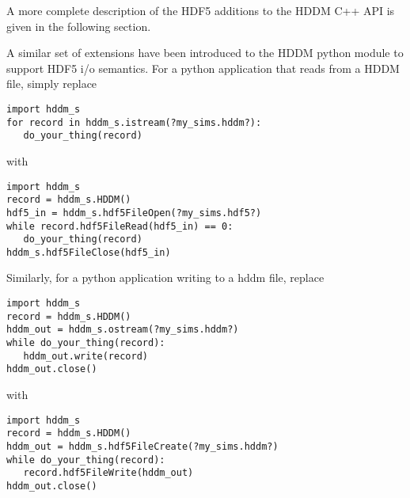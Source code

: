 \documentclass{revtex4}
\begin{document}
A more complete description of the HDF5 additions to the HDDM C++ API is
given in the following section.

A similar set of extensions have been introduced to the HDDM python module
to support HDF5 i/o semantics. For a python application that reads from a
HDDM file, simply replace

\vspace{0.5cm}
\begin{minipage}{12cm}
\begin{verbatim}
import hddm_s
for record in hddm_s.istream(?my_sims.hddm?):
   do_your_thing(record)
\end{verbatim}
\end{minipage}
\vspace{0.5cm}

with

\vspace{0.5cm}
\begin{minipage}{12cm}
\begin{verbatim}
import hddm_s
record = hddm_s.HDDM()
hdf5_in = hddm_s.hdf5FileOpen(?my_sims.hdf5?)
while record.hdf5FileRead(hdf5_in) == 0:
   do_your_thing(record)
hddm_s.hdf5FileClose(hdf5_in)
\end{verbatim}
\end{minipage}
\vspace{0.5cm}

Similarly, for a python application writing to a hddm file, replace

\vspace{0.5cm}
\begin{minipage}{12cm}
\begin{verbatim}
import hddm_s
record = hddm_s.HDDM()
hddm_out = hddm_s.ostream(?my_sims.hddm?)
while do_your_thing(record):
   hddm_out.write(record)
hddm_out.close()
\end{verbatim}
\end{minipage}
\vspace{0.5cm}

with

\vspace{0.5cm}
\begin{minipage}{12cm}
\begin{verbatim}
import hddm_s
record = hddm_s.HDDM()
hddm_out = hddm_s.hdf5FileCreate(?my_sims.hddm?)
while do_your_thing(record):
   record.hdf5FileWrite(hddm_out)
hddm_out.close()
\end{verbatim}
\end{minipage}
\vspace{0.5cm}
\end{document}
